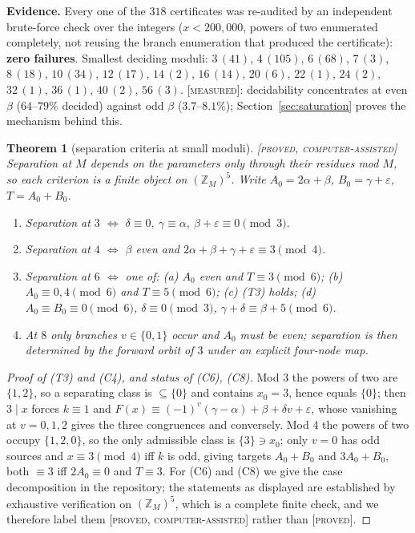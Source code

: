 \documentclass[11pt]{article}
\newtheorem{theorem}{Theorem}[section]
\theoremstyle{definition}
\theoremstyle{remark}
\newenvironment{evidence}
  {\par\smallskip\noindent\footnotesize\textbf{Evidence.}}
  {\par\smallskip}
\newcommand{\Z}{\mathbb{Z}}
\newcommand{\Proved}{\textsc{[proved]}}
\newcommand{\CAP}{\textsc{[proved, computer-assisted]}}
\newcommand{\Meas}{\textsc{[measured]}}
\begin{document}
\begin{evidence}
Every one of the $318$ certificates was re-audited by an independent
brute-force check over the integers ($x<200{,}000$, powers of two enumerated
completely, not reusing the branch enumeration that produced the certificate):
\textbf{zero failures}.  Smallest deciding moduli:
$3\,(41)$, $4\,(105)$, $6\,(68)$, $7\,(3)$, $8\,(18)$, $10\,(34)$, $12\,(17)$,
$14\,(2)$, $16\,(14)$, $20\,(6)$, $22\,(1)$, $24\,(2)$, $32\,(1)$, $36\,(1)$,
$40\,(2)$, $56\,(3)$.  \Meas{}: decidability concentrates at even $\beta$
($64$--$79\%$ decided) against odd $\beta$ ($3.7$--$8.1\%$);
Section~\ref{sec:saturation} proves the mechanism behind this.
\end{evidence}

\begin{theorem}[separation criteria at small moduli]\label{thm:criteria}
\CAP{}\; Separation at $M$ depends on the parameters only through their
residues mod $M$, so each criterion is a finite object on $(\Z_M)^5$.  Write
$A_0=2\alpha+\beta$, $B_0=\gamma+\varepsilon$, $T=A_0+B_0$.
\begin{enumerate}
\item[(T3)] Separation at $3$ $\iff$
  $\delta\equiv0,\ \gamma\equiv\alpha,\ \beta+\varepsilon\equiv0 \pmod 3$.
\item[(C4)] Separation at $4$ $\iff$ $\beta$ even and
  $2\alpha+\beta+\gamma+\varepsilon\equiv3\pmod4$.
\item[(C6)] Separation at $6$ $\iff$ one of: (a) $A_0$ even and
  $T\equiv3\pmod6$; (b) $A_0\equiv0,4\pmod6$ and $T\equiv5\pmod6$;
  (c) (T3) holds; (d) $A_0\equiv B_0\equiv0\pmod6$, $\delta\equiv0\pmod3$,
  $\gamma+\delta\equiv\beta+5\pmod6$.
\item[(C8)] At $8$ only branches $v\in\{0,1\}$ occur and $A_0$ must be even;
  separation is then determined by the forward orbit of $3$ under an explicit
  four-node map.
\end{enumerate}
\end{theorem}

\begin{proof}[Proof of (T3) and (C4), and status of (C6), (C8)]
Mod $3$ the powers of two are $\{1,2\}$, so a separating class is $\subseteq
\{0\}$ and contains $x_0=3$, hence equals $\{0\}$; then $3\mid x$ forces
$k\equiv1$ and
$F(x)\equiv(-1)^{v}(\gamma-\alpha)+\beta+\delta v+\varepsilon$, whose vanishing
at $v=0,1,2$ gives the three congruences and conversely.  Mod $4$ the powers of
two occupy $\{1,2,0\}$, so the only admissible class is $\{3\}\ni x_0$; only
$v=0$ has odd sources and $x\equiv3\pmod4$ iff $k$ is odd, giving targets
$A_0+B_0$ and $3A_0+B_0$, both $\equiv3$ iff $2A_0\equiv0$ and $T\equiv3$.
For (C6) and (C8) we give the case decomposition in the repository; the
statements as displayed are established by exhaustive verification on
$(\Z_M)^5$, which is a complete finite check, and we therefore label them
\CAP{} rather than \Proved{}.
\end{proof}
\end{document}
